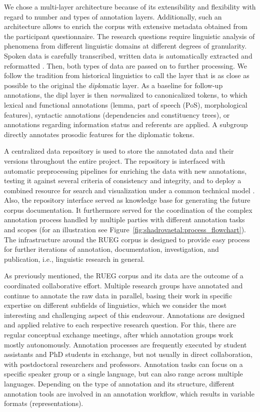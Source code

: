 \documentclass[output=paper,colorlinks,citecolor=brown]{langscibook}
\begin{document}
We chose a multi-layer architecture \parencite{Zeldes2018} because of its extensibility and flexibility with regard to number and types of annotation layers. Additionally, such an architecture allows to enrich the corpus with extensive metadata obtained from the participant questionnaire. The research questions require linguistic analysis of phenomena from different linguistic domains at different degrees of granularity. Spoken data is carefully transcribed, written data is automatically extracted and reformatted \parencite{Schmidt2009,Boersma2001}. Then, both types of data are passed on to further processing. We follow the tradition from historical linguistics to call the layer that is as close as possible to the original the \textit{dipl}omatic layer.
As a baseline for follow-up annotations, the dipl layer is then \textit{norm}alized to canonicalized tokens, to which lexical and functional annotations (lemma, part of speech (PoS), morphological features), syntactic annotations (dependencies and constituency trees), or annotations regarding information status and referents are applied. A subgroup directly annotates prosodic features for the diplomatic tokens.

A centralized data repository is used to store the annotated data and their versions throughout the entire project. The repository is interfaced with automatic preprocessing pipelines for enriching the data with new annotations, testing it against several criteria of consistency and integrity, and to deploy a combined resource for search and visualization under a common technical model \parencite{zipser_model_2010,krause_annis:_2019,Krause_Annatto_2023}. Also, the repository interface served as knowledge base for generating the future corpus documentation. It furthermore served for the coordination of the complex annotation process handled by multiple parties with different annotation tasks and scopes (for an illustration see Figure~\ref{fig:shadrovaetal:process_flowchart}). The infrastructure around the RUEG corpus is designed to provide easy process for further iterations of annotation, documentation, investigation, and publication, i.e., linguistic research in general. 

As previously mentioned, the RUEG corpus and its data are the outcome of a coordinated collaborative effort. Multiple research groups have annotated and continue to annotate the raw data in parallel, basing their work in specific expertise on different subfields of linguistics, which we consider the most interesting and challenging aspect of this endeavour. Annotations are designed and applied relative to each respective research question. For this, there are regular conceptual exchange meetings, after which annotation groups work mostly autonomously. Annotation processes are frequently executed by student assistants and PhD students in exchange, but not usually in direct collaboration, with postdoctoral researchers and professors. Annotation tasks can focus on a specific speaker group or a single language, but can also range across multiple languages. %
Depending on the type of annotation and its structure, different annotation tools are involved in an annotation workflow, which results in variable formats (representations).
\end{document}
